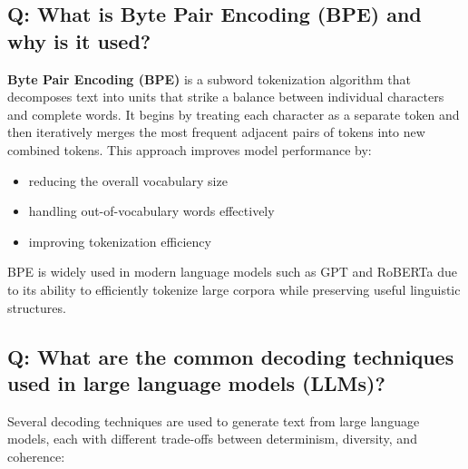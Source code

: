 \documentclass[11pt]{article}
\begin{document}
\subsection*{Q: What is Byte Pair Encoding (BPE) and why is it used?}
\textbf{Byte Pair Encoding (BPE)} is a subword tokenization algorithm that decomposes text into units that strike a balance between individual characters and complete words. It begins by treating each character as a separate token and then iteratively merges the most frequent adjacent pairs of tokens into new combined tokens. This approach improves model performance by:
\begin{itemize}
	\item reducing the overall vocabulary size
	\item handling out-of-vocabulary words effectively
	\item improving tokenization efficiency
\end{itemize}

BPE is widely used in modern language models such as GPT and RoBERTa due to its ability to efficiently tokenize large corpora while preserving useful linguistic structures.

\subsection*{Q: What are the common decoding techniques used in large language models (LLMs)?}
Several decoding techniques are used to generate text from large language models, each with different trade-offs between determinism, diversity, and coherence:
\end{document}

